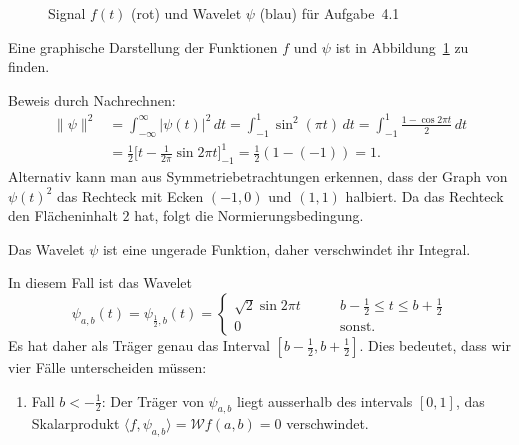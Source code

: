 \begin{loesung}
\begin{figure}
\caption{Signal $f(t)$ (rot) und Wavelet $\psi$ (blau) für Aufgabe~4.1
\label{04001:funktionen}}
\end{figure}
Eine graphische Darstellung der Funktionen $f$ und $\psi$ ist in
Abbildung~\ref{04001:funktionen} zu finden.
\begin{teilaufgaben}
\item
Beweis durch Nachrechnen:
\begin{align*}
\|\psi\|^2
&=
\int_{-\infty}^\infty |\psi(t)|^2\,dt
=
\int_{-1}^1 \sin^2(\pi t)\,dt
=
\int_{-1}^1 \frac{1-\cos 2\pi t}{2}\,dt
\\
&=
\frac12\biggl[
t-\frac{1}{2\pi}\sin 2\pi t
\biggr]_{-1}^{1}
=\frac12(1-(-1))
=
1.
\end{align*}
Alternativ kann man aus Symmetriebetrachtungen erkennen, dass der Graph
von $\psi(t)^2$ das Rechteck mit Ecken $(-1,0)$ und $(1,1)$ halbiert.
Da das Rechteck den Flächeninhalt $2$ hat, folgt die Normierungsbedingung.
\item
Das Wavelet $\psi$ ist eine ungerade Funktion, daher verschwindet ihr
Integral.
\item
In diesem Fall ist das Wavelet
\[
\psi_{a,b}(t)
=
\psi_{\frac12,b}(t)
=
\begin{cases}
\sqrt{2}\sin 2\pi t&\qquad b-\frac12\le t\le b+\frac12
\\
0&\qquad\text{sonst.}
\end{cases}
\]
Es hat daher als Träger genau das Interval $[b-\frac12,b+\frac12]$.
Dies bedeutet, dass wir vier Fälle unterscheiden müssen:
\begin{enumerate}
\item
Fall $b < -\frac12$:  Der Träger von $\psi_{a,b}$ liegt ausserhalb des
intervals $[0,1]$, das Skalarprodukt
$\langle f,\psi_{a,b}\rangle=\mathcal{W}f(a,b)=0$ verschwindet.

\end{enumerate}
\end{teilaufgaben}
\end{loesung}
